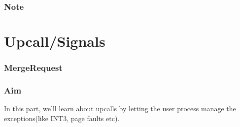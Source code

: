 \documentclass[]{book}
\newenvironment{Shaded}{}{}
\newcommand{\KeywordTok}[1]{\textbf{{#1}}}
\newcommand{\NormalTok}[1]{{#1}}
\begin{document}
\subsubsection*{Note}\label{note-12}

\section{Upcall/Signals}\label{upcallsignals}

\subsubsection*{MergeRequest}\label{mergerequest-11}

\begin{Shaded}
\end{Shaded}

\subsubsection*{Aim}\label{aim-11}

In this part, we'll learn about upcalls by letting the user process
manage the exceptions(like INT3, page faults etc).
\end{document}
